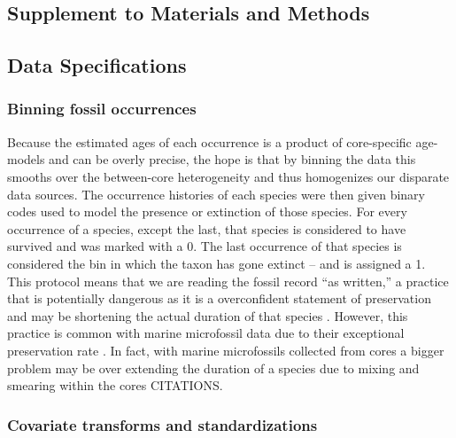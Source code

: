 \documentclass[12pt,letterpaper]{article}
\newcommand{\beginsupplement}{
  \setcounter{section}{0}
  \renewcommand{\thesection}{S\arabic{section}}
  \setcounter{table}{0}
  \renewcommand{\thetable}{S\arabic{table}}
  \setcounter{figure}{0}
  \renewcommand{\thefigure}{S\arabic{figure}}
  \setcounter{equation}{0}
  \renewcommand{\theequation}{S\arabic{equation}}
}
\begin{document}
\beginsupplement
\begin{refsection}

  
\section{Supplement to Materials and Methods}

\subsection{Data Specifications} \label{sec:data_desc}

\subsubsection{Binning fossil occurrences}

Because the estimated ages of each occurrence is a product of core-specific age-models and can be overly precise, the hope is that by binning the data this smooths over the between-core heterogeneity and thus homogenizes our disparate data sources. The occurrence histories of each species were then given binary codes used to model the presence or extinction of those species. For every occurrence of a species, except the last, that species is considered to have survived and was marked with a 0. The last occurrence of that species is considered the bin in which the taxon has gone extinct -- and is assigned a 1. This protocol means that we are reading the fossil record ``as written,'' a practice that is potentially dangerous as it is a overconfident statement of preservation and may be shortening the actual duration of that species \citep{Alroy2010,Alroy2000b,Alroy2014,Foote1997,Foote1999a,Foote2001,Foote1996e,Lloyd2012b,Marshall1995,Wang2016}. However, this practice is common with marine microfossil data due to their exceptional preservation rate \citep{Ezard2013,Ezard2016,Ezard2011,Liow2010}. In fact, with marine microfossils collected from cores a bigger problem may be over extending the duration of a species due to mixing and smearing within the cores CITATIONS.

\subsubsection{Covariate transforms and standardizations}


\end{refsection}
\end{document}
